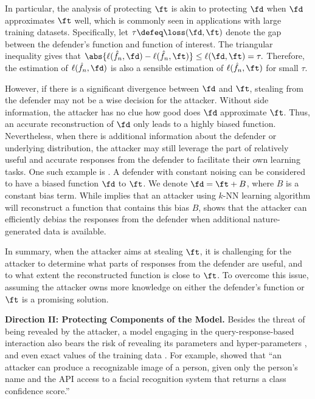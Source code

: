         In particular, the analysis of protecting $\ft$ is akin to protecting $\fd$ when $\fd$ approximates $\ft$ well, which is commonly seen in applications with large training datasets. Specifically, let $\tau \defeq \loss(\fd, \ft)$ denote the gap between the defender's function and function of interest. The triangular inequality gives that
        $\abs{\ell(\hat{f}_n, \fd) -  \ell(\hat{f}_n, \ft)} \leq \ell(\fd, \ft) = \tau.$
        Therefore, the estimation of $\ell(\hat{f}_n, \fd)$ is also a sensible estimation of $\ell(\hat{f}_n, \ft)$ for small $\tau$. 
        
        However, if there is a significant divergence between $\fd$ and $\ft$, stealing from the defender may not be a wise decision for the attacker. Without side information, the attacker has no clue how good does $\fd$ approximate $\ft$. Thus, an accurate reconstruction of $\fd$ only leads to a highly biased function. Nevertheless, when there is additional information about the defender or underlying distribution, the attacker may still leverage the part of relatively useful and accurate responses from the defender to facilitate their own learning tasks. One such example is . A defender with constant noising can be considered to have a biased function $\fd$ to $\ft$. We denote $\fd=\ft+B$, where $B$ is a constant bias term. While  implies that an attacker using $k$-NN learning algorithm will reconstruct a function that contains this bias $B$, 
         shows that the attacker can efficiently debias the responses from the defender when additional nature-generated data is available.
        
        In summary, when the attacker aims at stealing $\ft$, it is challenging for the attacker to determine what parts of responses from the defender are useful, and to what extent the reconstructed function is close to $\ft$. To overcome this issue, assuming the attacker owns more knowledge on either the defender's function or $\ft$ is a promising solution.

    \textbf{Direction II: Protecting Components of the Model.} 
    Besides the threat of being revealed by the attacker,
    a model engaging in the query-response-based interaction also bears the risk of revealing its parameters and hyper-parameters \citep{tramer2016stealing, wang2018stealing}, and even exact values of the training data \citep{fredrikson2014privacy, fredrikson2015model}. For example, \citet{fredrikson2015model} showed that ``an attacker can produce a recognizable image of a person, given only the person's name and the API access to a facial recognition system that returns a class confidence score.''

